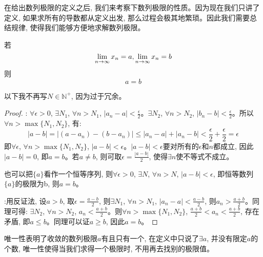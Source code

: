 在给出数列极限的定义之后, 我们来考察下数列极限的性质。因为现在我们只讲了定义, 如果求所有的导数都从定义出发, 那么过程会极其地繁琐。因此我们需要总结规律, 使得我们能够方便地求解数列极限。
\begin{theorem}[数列极限的唯一性]\label{theorem:limit-uniqueness}
    若
    \begin{equation*}
        \lim_{n \to \infty } x_n = a, \lim_{n \to \infty } x_n = b
    \end{equation*}
    则
    \begin{equation*}
        a = b
    \end{equation*}
\end{theorem}
\begin{remark}
    以下我不再写$N \in \mathbb{N}^+$, 因为过于冗余。
\end{remark}
\begin{proof}
    : $\forall \epsilon > 0$, $\exists N_1$, $\forall n > N_1$, $\left| a_n - a \right|< \frac{\epsilon}{2}$。$\exists N_2$, $\forall n > N_2$, $\left| b_n - b \right|< \frac{\epsilon}{2}$。所以$\forall n > \max\{N_1, N_2\}$, 有:
    \begin{equation*}
        \left| a - b \right| = \left| (a - a_n) - (b - a_n) \right| \le \left| a_n - a \right| + \left| a_n - b \right| < \frac{\epsilon}{2} + \frac{\epsilon}{2} = \epsilon
    \end{equation*}
    即$\forall \epsilon$, $\forall n > \max\{N_1, N_2\}$, $\left| a - b \right| < \epsilon$。$\left| a - b \right| < \epsilon$要对所有的$\epsilon$和$n$都成立, 因此$\left| a - b \right| = 0$, 即$a = b$。若$a \neq b$, 则可取$\epsilon = \frac{\left| a - b \right|}{2}$, 使得$\exists n$使不等式不成立。

    \begin{remark}
        也可以把$\{a\}$看作一个恒等序列, 则$\forall \epsilon > 0$, $\exists N$, $\forall n > N$, $\left| a - b \right| < \epsilon$, 即恒等数列$\{a\}$的极限为b, 则$a = b$。
    \end{remark}

    :用反证法, 设$a > b$, 取$\epsilon = \frac{a - b}{2}$, 则$\exists N_1$, $\forall n > N_1$, $\left| a_n - a \right| < \frac{a - b}{2}$, 则$a_n > \frac{a + b}{2}$。同理可得: $\exists N_2$, $\forall n > N_2$, $a_n < \frac{a + b}{2}$。则$\forall n > \max\{N_1, N_2\}$, $\frac{a+b}{2} < a_n < \frac{a+b}{2}$, 存在矛盾, 即$a \le b$。同理可以证$a \ge b$, 因此$a = b$。
\end{proof}
\begin{remark}
    唯一性表明了收敛的数列极限$a$有且只有一个, 在定义中只说了$\exists a$, 并没有限定$a$的个数, 唯一性使得当我们求得一个极限时, 不用再去找别的极限值。
\end{remark}

